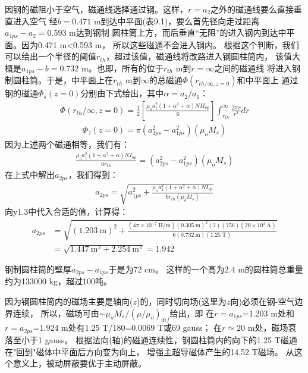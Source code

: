 因钢的磁阻小于空气，磁通线选择通过钢。这样，$r=a_2$之外的磁通线要么直接垂直进入空气
经$b=0.471$ m到达中平面(表9.1)，要么首先径向走过距离$a_{1ps}-a_2=0.593$ m达到钢制
圆柱筒上方，而后垂直“无阻”的进入钢内到达中平面。因为0.471 m<0.593 m，
所以这些磁通不会进入钢内。
根据这个判断，我们可以给出一个半径的阈值$r_{th}$，超过该值，磁通线将改路进入钢圆柱筒内，
该值大概是$a_{1ps}-b=0.732$ m。也即，所有的位于$r_{th}$ m到$r=\infty$之间的磁通线
将进入钢制圆柱筒。于是，中平面上在$r_{th}$ m到$\infty$的总磁通$\Phi(r_{th/\infty,z=0})$和中平面上
通过钢的磁通$\Phi_s(z=0)$分别由下式给出，其中$\alpha=a_2/a_1$：
\begin{align*}%
\Phi(r_{th}/\infty,z=0)=\frac{1}{2}[\frac{\mu_oa_1^2(1+\alpha^2+\alpha)NII_{op}}{6}]\int_{r_{th}}^{\infty}\frac{2\pi r}{r^3}dr \tag{y1.1a}
\end{align*}
\begin{align*}
\Phi_{z}(z=0)=\pi(a_{2ps}^2-a_{1ps}^2)(\mu_oM_s) \tag{y1.1b}
\end{align*}
因为上述两个磁通相等，我们有：
\begin{align*}%
\frac{\mu_oa_1^2(1+\alpha^2+\alpha)NI_{op}}{6r_{th}}=(a_{2ps}^2-a_{1ps}^2)(\mu_oM_s) \tag{y1.2}
\end{align*}
在上式中解出$a_{2ps}$，我们得到：
\begin{align*}%
a_{2ps}=\sqrt{a_{1ps}^2+\frac{\mu_oa_1^2(1+\alpha^2+\alpha)NI_{op}}{6r_{th}(\mu_oM_s)}} \tag{y1.3}
\end{align*}
向y1.3中代入合适的值，计算得：
\begin{align*}%
a_{2ps}&=\sqrt{(1.203\ \mathrm{m})^2+\frac{(4\pi\times 10^{-7}\ \mathrm{H/m})(0.305\ \mathrm{m})^2(7)(756)(20\times 10^3\ \mathrm{A})}{6(0.732\ \mathrm{m})(1.25\ \mathrm{T})}}\\
&=\sqrt{1.447\ \mathrm{m^2}+2.254\ \mathrm{m^2}}=1.942
\end{align*}

钢制圆柱筒的壁厚$a_{2ps}-a_{1ps}$于是为72 cm。
这样的一个高为2.4 m的圆柱筒总重量约为133000 kg，超过100吨。

因为钢圆柱筒内的磁场主要是轴向($z$)的，同时切向场(这里为$z$向)必须在钢-空气边界连续，
所以，磁场可由$\sim \mu_o M_s/(\mu/\mu_o)_{dif}$给出，即
在$r=a_{1ps}$=1.203 m处和$r=a_{2ps}$=1.924 m处有1.25 T/180=0.0069 T或69 gauss；
在$r\simeq 20$ m处，磁场衰落至小于1 gauss。
根据法向(轴)的磁通连续性，钢圆柱筒内的向下的1.25 T磁通在"回到"磁体中平面后方向变为向上，
增强主超导磁体产生的14.52 T磁场。
从这个意义上，被动屏蔽要优于主动屏蔽。

